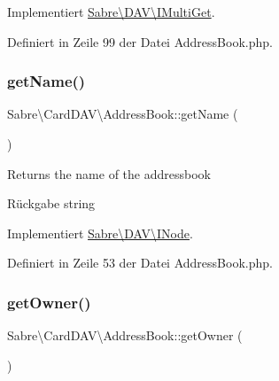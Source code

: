 Implementiert \mbox{\hyperlink{interface_sabre_1_1_d_a_v_1_1_i_multi_get_a4d66db5c26d9247511687cd277799528}{Sabre\textbackslash{}\+D\+A\+V\textbackslash{}\+I\+Multi\+Get}}.



Definiert in Zeile 99 der Datei Address\+Book.\+php.

\mbox{\label{class_sabre_1_1_card_d_a_v_1_1_address_book_ae863b895bc101d7532edd8aa9ea40c4c}} 
\subsubsection{\texorpdfstring{get\+Name()}{getName()}}
{\footnotesize\ttfamily Sabre\textbackslash{}\+Card\+D\+A\+V\textbackslash{}\+Address\+Book\+::get\+Name (\begin{DoxyParamCaption}{ }\end{DoxyParamCaption})}

Returns the name of the addressbook

\begin{DoxyReturn}{Rückgabe}
string 
\end{DoxyReturn}


Implementiert \mbox{\hyperlink{interface_sabre_1_1_d_a_v_1_1_i_node_ab616fe836b1ae36af12126a2bc934dce}{Sabre\textbackslash{}\+D\+A\+V\textbackslash{}\+I\+Node}}.



Definiert in Zeile 53 der Datei Address\+Book.\+php.

\mbox{\label{class_sabre_1_1_card_d_a_v_1_1_address_book_a305c57570d6a0434064deb1c3fa551f1}} 
\subsubsection{\texorpdfstring{get\+Owner()}{getOwner()}}
{\footnotesize\ttfamily Sabre\textbackslash{}\+Card\+D\+A\+V\textbackslash{}\+Address\+Book\+::get\+Owner (\begin{DoxyParamCaption}{ }\end{DoxyParamCaption})}

